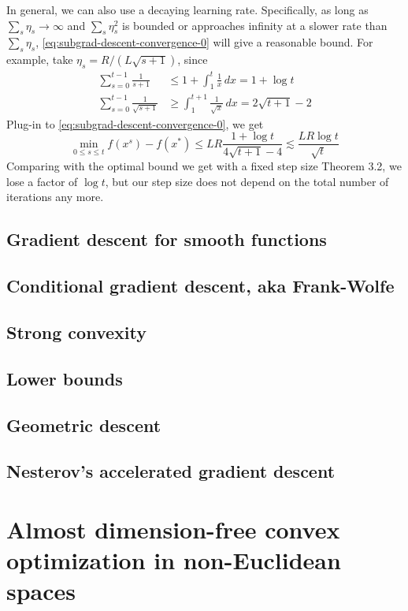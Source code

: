 \documentclass{scrartcl}
\begin{document}
In general, we can also use a decaying learning rate. Specifically, as long as
$\sum_s\eta_s\rightarrow \infty$ and $\sum_s\eta_s^2$ is bounded or approaches infinity at a slower
rate than $\sum_s\eta_s$, \eqref{eq:subgrad-descent-convergence-0} will give a reasonable bound. For
example, take $\eta_s=R/(L\sqrt{s+1})$, since
\[
\begin{aligned}
  \sum_{s=0}^{t-1} \frac{1}{s+1} &\leq 1 + \int_1^{t} \frac{1}{x}\,dx = 1 + \log t \\
  \sum_{s=0}^{t-1} \frac{1}{\sqrt{s+1}} &\geq \int_1^{t+1}\frac{1} {\sqrt{x}}\,dx =
  2\sqrt{t+1}-2
\end{aligned}
\]
Plug-in to \eqref{eq:subgrad-descent-convergence-0}, we get
\begin{equation}
  \min_{0\leq s \leq t} f(x^s) - f(x^*)
  \leq LR \frac{1+\log t}{4\sqrt{t+1}-4} \lesssim \frac
  {LR\log t}{\sqrt{t}}
\end{equation}
Comparing with the optimal bound we get with a fixed step size Theorem 3.2,
we lose a factor of $\log t$, but our step size does not depend on the total number of iterations any
more.

\subsection{Gradient descent for smooth functions}
\subsection{Conditional gradient descent, aka Frank-Wolfe}
\subsection{Strong convexity}
\subsection{Lower bounds}
\subsection{Geometric descent}
\subsection{Nesterov's accelerated gradient descent}

\section{Almost dimension-free convex optimization in non-Euclidean spaces}
\end{document}
